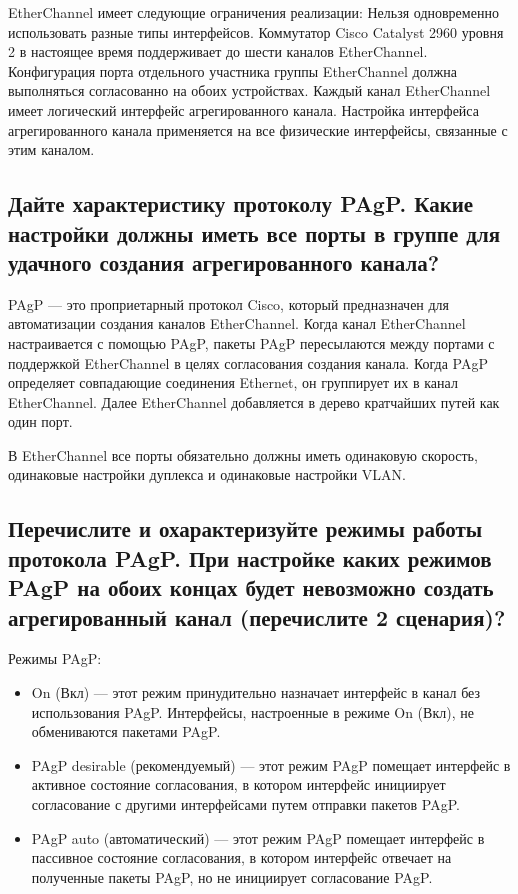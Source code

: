 EtherChannel имеет следующие ограничения реализации:
Нельзя одновременно использовать разные типы интерфейсов.
Коммутатор Cisco Catalyst 2960 уровня 2 в настоящее время 
поддерживает до шести каналов EtherChannel.
Конфигурация порта отдельного участника группы EtherChannel 
должна выполняться согласованно на обоих устройствах.
Каждый канал EtherChannel имеет логический интерфейс 
агрегированного канала. Настройка интерфейса агрегированного 
канала применяется на все физические интерфейсы, связанные с этим 
каналом.

\subsection{Дайте характеристику протоколу PAgP. Какие настройки 
должны иметь все порты в группе для удачного создания 
агрегированного канала?}
PAgP — это проприетарный протокол Cisco, который предназначен 
для автоматизации создания каналов EtherChannel. Когда канал EtherChannel 
настраивается с помощью PAgP, пакеты PAgP пересылаются между портами 
с поддержкой EtherChannel в целях согласования создания канала. Когда 
PAgP определяет совпадающие соединения Ethernet, он группирует их в 
канал EtherChannel. Далее EtherChannel добавляется в дерево кратчайших 
путей как один порт.

В EtherChannel все порты обязательно должны иметь одинаковую 
скорость, одинаковые настройки дуплекса и одинаковые настройки VLAN.

\subsection{Перечислите и охарактеризуйте режимы работы протокола 
PAgP. При настройке каких режимов PAgP на обоих концах 
будет невозможно создать агрегированный канал (перечислите 2 
сценария)?}
Режимы PAgP:
\begin{itemize}
	\item On (Вкл) --- этот режим принудительно назначает интерфейс в 
		канал без использования PAgP. Интерфейсы, настроенные в режиме 
		On (Вкл), не обмениваются пакетами PAgP.
	\item PAgP desirable (рекомендуемый) --- этот режим PAgP помещает 
		интерфейс в активное состояние согласования, в котором 
		интерфейс инициирует согласование с другими интерфейсами 
		путем отправки пакетов PAgP.
	\item PAgP auto (автоматический) --- этот режим PAgP помещает 
		интерфейс в пассивное состояние согласования, в котором 
		интерфейс отвечает на полученные пакеты PAgP, но не инициирует 
		согласование PAgP.
\end{itemize}

